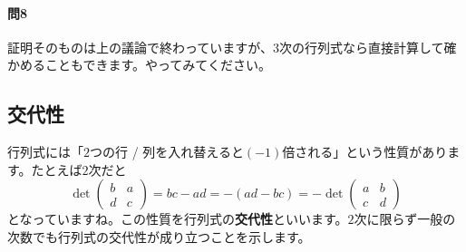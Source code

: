 \paragraph{問8} 証明そのものは上の議論で終わっていますが、$3$次の行列式なら直接計算して確かめることもできます。やってみてください。

\subsection{交代性}

行列式には「$2$つの行 / 列を入れ替えると$(-1)$倍される」という性質があります。たとえば$2$次だと
\[
\det
\begin{pmatrix}
b & a \\
d & c
\end{pmatrix}
= bc - ad = - (ad - bc)
= -\det
\begin{pmatrix}
a & b \\
c & d
\end{pmatrix}
\]
となっていますね。この性質を行列式の\textbf{交代性}といいます。$2$次に限らず一般の次数でも行列式の交代性が成り立つことを示します。

